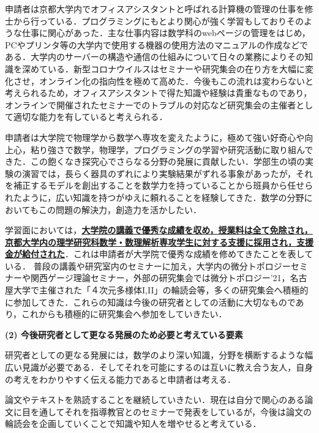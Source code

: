 \documentclass[11pt,a4j,dvipdfmx]{jarticle} 					%
\newcommand{\研究課題名}{象の卵}
\newcommand{\研究機関名}{京都大学}
\newcommand{\研究代表者氏名}{福士謙二}
\begin{document}
申請者は京都大学内でオフィスアシスタントと呼ばれる計算機の管理の仕事を修士から行っている．プログラミングにもとより関心が強く学習もしておりそのような仕事に関心があった．主な仕事内容は数学科のwebページの管理をはじめ，PCやプリンタ等の大学内で使用する機器の使用方法のマニュアルの作成などである．大学内のサーバーの構造や通信の仕組みについて日々の業務によりその知識を深めている．新型コロナウイルスはセミナーや研究集会の在り方を大幅に変化させ，オンライン化の指向性を極めて高めた．今後もこの流れは変わらないと考えられるため，オフィスアシスタントで得た知識や経験は貴重なものであり，オンラインで開催されたセミナーでのトラブルの対応など研究集会の主催者として適切な能力を有していると考えられる．



\noindent
{}


申請者は大学院で物理学から数学へ専攻を変えたように，極めて強い好奇心や向上心，粘り強さで数学，物理学，プログラミングの学習や研究活動に取り組んできた．この飽くなき探究心でさらなる分野の発展に貢献したい．学部生の頃の実験の演習では，長らく器具のずれにより実験結果がずれる事象があったが，それを補正するモデルを創出することを数学力を持っていることから班員から任せられたように，広い知識を持つがゆえに頼れることを経験してきた．数学の分野においてもこの問題の解決力，創造力を活かしたい．

学習面においては，\textbf{\ul{大学院の講義で優秀な成績を収め，授業料は全て免除され，京都大学内の理学研究科数学・数理解析専攻学生に対する支援に採用され，支援金が給付された}}．これは申請者が大学院で優秀な成績を修めてきたことを表している．
普段の講義や研究室内のセミナーに加え，大学内の微分トポロジーセミナーや関西ゲージ理論セミナー，外部の研究集会では微分トポロジー'21，名古屋大学で主催された「４次元多様体I,II」の輪読会等，多くの研究集会へ積極的に参加してきた．これらの知識は今後の研究者としての活動に大切なものであり，これからも積極的に研究集会へ参加をしていきたい．





\vspace{5mm}
\noindent
\textbf{(2) 今後研究者として更なる発展のため必要と考えている要素}


研究者としての更なる発展には，数学のより深い知識，分野を横断するような幅広い見識が必要である．そしてそれを可能にするのは互いに教え合う友人，自身の考えをわかりやすく伝える能力であると申請者は考える．


\noindent
{}

論文やテキストを熟読することを継続していきたい．現在は自分で関心のある論文に目を通してそれを指導教官とのセミナーで発表をしているが，今後は論文の輪読会を企画していくことで知識や知人を増やせると考えている．
\end{document}
